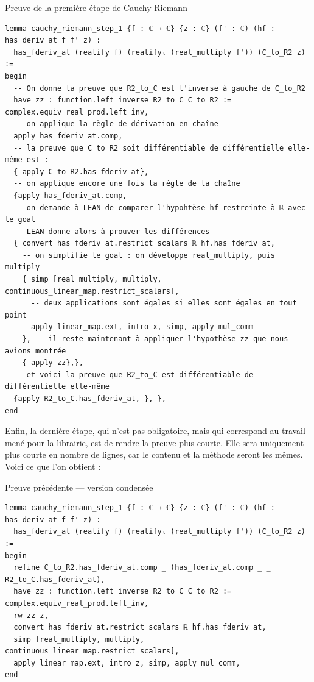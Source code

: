 \documentclass[a4paper, 11pt, twoside]{report}
\begin{document}
\begin{code}{Preuve de la première étape de Cauchy-Riemann}
\begin{lstlisting}
lemma cauchy_riemann_step_1 {f : ℂ → ℂ} {z : ℂ} (f' : ℂ) (hf : has_deriv_at f f' z) : 
  has_fderiv_at (realify f) (realifyₗ (real_multiply f')) (C_to_R2 z) := 
begin
  -- On donne la preuve que R2_to_C est l'inverse à gauche de C_to_R2
  have zz : function.left_inverse R2_to_C C_to_R2 := complex.equiv_real_prod.left_inv,
  -- on applique la règle de dérivation en chaîne
  apply has_fderiv_at.comp,
  -- la preuve que C_to_R2 soit différentiable de différentielle elle-même est :
  { apply C_to_R2.has_fderiv_at},
  -- on applique encore une fois la règle de la chaîne
  {apply has_fderiv_at.comp,
  -- on demande à LEAN de comparer l'hypohtèse hf restreinte à ℝ avec le goal
  -- LEAN donne alors à prouver les différences
  { convert has_fderiv_at.restrict_scalars ℝ hf.has_fderiv_at,
    -- on simplifie le goal : on développe real_multiply, puis multiply
    { simp [real_multiply, multiply, continuous_linear_map.restrict_scalars],
      -- deux applications sont égales si elles sont égales en tout point
      apply linear_map.ext, intro x, simp, apply mul_comm
    }, -- il reste maintenant à appliquer l'hypothèse zz que nous avions montrée
    { apply zz},},
  -- et voici la preuve que R2_to_C est différentiable de différentielle elle-même
  {apply R2_to_C.has_fderiv_at, }, },
end
\end{lstlisting}
\end{code}

Enfin, la dernière étape, qui n'est pas obligatoire, mais qui correspond au travail mené pour la librairie, est de rendre la preuve plus courte. Elle sera uniquement plus courte en nombre de lignes, car le contenu et la méthode seront les mêmes. Voici ce que l'on obtient :

\begin{code}{Preuve précédente --- version condensée}
\begin{lstlisting}
lemma cauchy_riemann_step_1 {f : ℂ → ℂ} {z : ℂ} (f' : ℂ) (hf : has_deriv_at f f' z) : 
  has_fderiv_at (realify f) (realifyₗ (real_multiply f')) (C_to_R2 z) := 
begin
  refine C_to_R2.has_fderiv_at.comp _ (has_fderiv_at.comp _ _ R2_to_C.has_fderiv_at),
  have zz : function.left_inverse R2_to_C C_to_R2 := complex.equiv_real_prod.left_inv, 
  rw zz z,
  convert has_fderiv_at.restrict_scalars ℝ hf.has_fderiv_at,
  simp [real_multiply, multiply, continuous_linear_map.restrict_scalars],
  apply linear_map.ext, intro z, simp, apply mul_comm,
end
\end{lstlisting}
\end{code}
\end{document}
